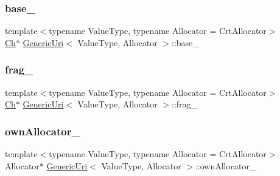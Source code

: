 \mbox{\label{classGenericUri_a0f4b06d9f60105fe6f47f16b0a258bc2}} 
\subsubsection{\texorpdfstring{base\+\_\+}{base\_}}
{\footnotesize\ttfamily template$<$typename Value\+Type, typename Allocator = Crt\+Allocator$>$ \\
\hyperlink{classGenericUri_a20d0602cff62211d89bc4b25963beeee}{Ch}$\ast$ \hyperlink{classGenericUri}{Generic\+Uri}$<$ Value\+Type, Allocator $>$\+::base\+\_\+\hspace{0.3cm}{\ttfamily [private]}}

\mbox{\label{classGenericUri_a0776231ad42838ccb66484fa12fa80ac}} 
\subsubsection{\texorpdfstring{frag\+\_\+}{frag\_}}
{\footnotesize\ttfamily template$<$typename Value\+Type, typename Allocator = Crt\+Allocator$>$ \\
\hyperlink{classGenericUri_a20d0602cff62211d89bc4b25963beeee}{Ch}$\ast$ \hyperlink{classGenericUri}{Generic\+Uri}$<$ Value\+Type, Allocator $>$\+::frag\+\_\+\hspace{0.3cm}{\ttfamily [private]}}

\mbox{\label{classGenericUri_af17ffab721cedc6db5ad2000bb13a06e}} 
\subsubsection{\texorpdfstring{own\+Allocator\+\_\+}{ownAllocator\_}}
{\footnotesize\ttfamily template$<$typename Value\+Type, typename Allocator = Crt\+Allocator$>$ \\
Allocator$\ast$ \hyperlink{classGenericUri}{Generic\+Uri}$<$ Value\+Type, Allocator $>$\+::own\+Allocator\+\_\+\hspace{0.3cm}{\ttfamily [private]}}



